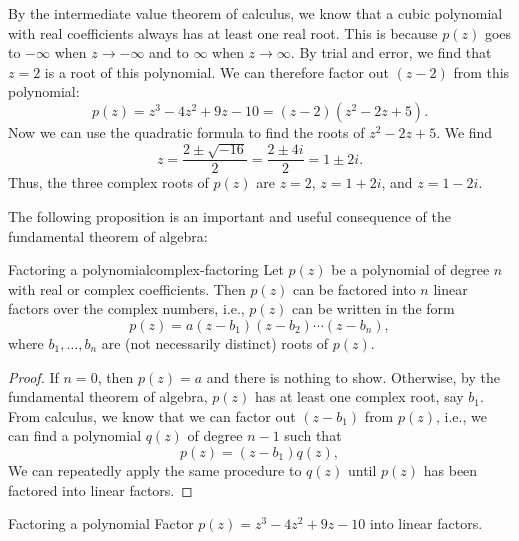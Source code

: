 \begin{solution}
  By the intermediate value theorem of calculus, we know that a cubic
  polynomial with real coefficients always has at least one real
  root. This is because $p(z)$ goes to $-\infty$ when $z\to-\infty$
  and to $\infty$ when $z\to\infty$. By trial and error, we find that
  $z=2$ is a root of this polynomial. We can therefore factor out
  $(z-2)$ from this polynomial:
  \begin{equation*}
    p(z) = z^3 - 4z^2 + 9z - 10 = (z-2)(z^2 - 2z + 5).
  \end{equation*}
  Now we can use the quadratic formula to find the roots of $z^2 - 2z
  + 5$. We find
  \begin{equation*}
    z = \frac{2\pm\sqrt{-16}}{2} = \frac{2\pm 4i}{2} = 1\pm 2i.
  \end{equation*}
  Thus, the three complex roots of $p(z)$ are $z=2$, $z=1+2i$, and $z=1-2i$.
\end{solution}

The following proposition is an important and useful consequence of
the fundamental theorem of algebra:

\begin{proposition}{Factoring a polynomial}{complex-factoring}
  Let $p(z)$ be a polynomial of degree $n$ with real or complex
  coefficients. Then $p(z)$ can be factored into $n$ linear factors
  over the complex numbers, i.e., $p(z)$ can be written in the form
  \begin{equation*}
    p(z) = a(z-b_1)(z-b_2)\cdots(z-b_n),
  \end{equation*}
  where $b_1,\ldots,b_n$ are (not necessarily distinct) roots of
  $p(z)$.
\end{proposition}

\begin{proof}
  If $n=0$, then $p(z)=a$ and there is nothing to show. Otherwise, by
  the fundamental theorem of algebra, $p(z)$ has at least one complex
  root, say $b_1$. From calculus, we know that we can factor out
  $(z-b_1)$ from $p(z)$, i.e., we can find a polynomial $q(z)$ of
  degree $n-1$ such that 
  \begin{equation*}
    p(z) = (z-b_1) q(z),
  \end{equation*}
  We can repeatedly apply the same procedure to $q(z)$ until $p(z)$
  has been factored into linear factors.
\end{proof}

\begin{example}{Factoring a polynomial}
  Factor $p(z) = z^3 - 4z^2 + 9z - 10$ into linear factors.
\end{example}

